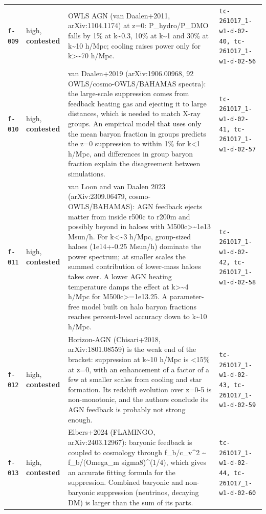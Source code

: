 \documentclass[11pt,a4paper]{article}
\begin{document}
\begin{longtable}{@{}p{}p{}p{}p{}@{}}
\texttt{f-009} & high, \textbf{contested} & OWLS AGN (van Daalen+2011, arXiv:1104.1174) at z=0: P\_hydro/P\_DMO falls by 1\% at k\textasciitilde{}0.3, 10\% at k\textasciitilde{}1 and 30\% at k\textasciitilde{}10 h/Mpc; cooling raises power only for k\textgreater{}\textasciitilde{}70 h/Mpc. & \texttt{tc-261017\_\allowbreak{}1-w1-d-02-40,\allowbreak{} tc-261017\_\allowbreak{}1-w1-d-02-56} \\
\texttt{f-010} & high, \textbf{contested} & van Daalen+2019 (arXiv:1906.00968, 92 OWLS/cosmo-OWLS/BAHAMAS spectra): the large-scale suppression comes from feedback heating gas and ejecting it to large distances, which is needed to match X-ray groups. An empirical model that uses only the mean baryon fraction in groups predicts the z=0 suppression to within 1\% for k\textless{}1 h/Mpc, and differences in group baryon fraction explain the disagreement between simulations. & \texttt{tc-261017\_\allowbreak{}1-w1-d-02-41,\allowbreak{} tc-261017\_\allowbreak{}1-w1-d-02-57} \\
\texttt{f-011} & high, \textbf{contested} & van Loon and van Daalen 2023 (arXiv:2309.06479, cosmo-OWLS/BAHAMAS): AGN feedback ejects matter from inside r500c to r200m and possibly beyond in haloes with M500c\textgreater{}\textasciitilde{}1e13 Msun/h. For k\textless{}\textasciitilde{}3 h/Mpc, group-sized haloes (1e14+-0.25 Msun/h) dominate the power spectrum; at smaller scales the summed contribution of lower-mass haloes takes over. A lower AGN heating temperature damps the effect at k\textgreater{}\textasciitilde{}4 h/Mpc for M500c\textgreater{}=1e13.25. A parameter-free model built on halo baryon fractions reaches percent-level accuracy down to k\textasciitilde{}10 h/Mpc. & \texttt{tc-261017\_\allowbreak{}1-w1-d-02-42,\allowbreak{} tc-261017\_\allowbreak{}1-w1-d-02-58} \\
\texttt{f-012} & high, \textbf{contested} & Horizon-AGN (Chisari+2018, arXiv:1801.08559) is the weak end of the bracket: suppression at k\textasciitilde{}10 h/Mpc is \textless{}15\% at z=0, with an enhancement of a factor of a few at smaller scales from cooling and star formation. Its redshift evolution over z=0-5 is non-monotonic, and the authors conclude its AGN feedback is probably not strong enough. & \texttt{tc-261017\_\allowbreak{}1-w1-d-02-43,\allowbreak{} tc-261017\_\allowbreak{}1-w1-d-02-59} \\
\texttt{f-013} & high, \textbf{contested} & Elbers+2024 (FLAMINGO, arXiv:2403.12967): baryonic feedback is coupled to cosmology through f\_b/c\_v\textasciicircum{}2 \textasciitilde{} f\_b/(Omega\_m sigma8)\textasciicircum{}(1/4), which gives an accurate fitting formula for the suppression. Combined baryonic and non-baryonic suppression (neutrinos, decaying DM) is larger than the sum of its parts. & \texttt{tc-261017\_\allowbreak{}1-w1-d-02-44,\allowbreak{} tc-261017\_\allowbreak{}1-w1-d-02-60} \\

\end{longtable}
\end{document}
